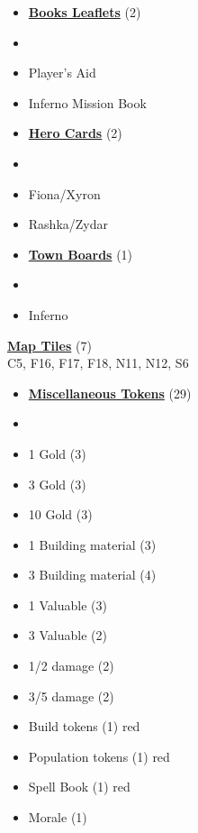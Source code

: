 
\begin{multicols*}{3}

\footnotesize

\begin{itemize}[leftmargin=0pt, label={}, noitemsep]
  \item \textbf{\small{\underline{Books Leaflets}}} (2)
  \item
  \item Player's Aid
  \item Inferno Mission Book
\end{itemize}

\begin{itemize}[leftmargin=0pt, label={}, noitemsep]
  \item \textbf{\small{\underline{Hero Cards}}} (2)
  \item
  \item Fiona/Xyron
  \item Rashka/Zydar
\end{itemize}

\begin{itemize}[leftmargin=0pt, label={}, noitemsep]
  \item \textbf{\small{\underline{Town Boards}}} (1)
  \item
  \item Inferno
\end{itemize}

\textbf{\small{\underline{Map Tiles}}} (7)\\

C5, F16, F17, F18, N11, N12, S6

\begin{itemize}[leftmargin=0pt, label={}, noitemsep]
  \item \textbf{\small{\underline{Miscellaneous Tokens}}} (29)
  \item
  \item 1 Gold (3)
  \item 3 Gold (3)
  \item 10 Gold (3)
  \item 1 Building material (3)
  \item 3 Building material (4)
  \item 1 Valuable (3)
  \item 3 Valuable (2)
  \item 1/2 damage (2)
  \item 3/5 damage (2)
  \item Build tokens (1) {red}
  \item Population tokens (1) {red}
  \item Spell Book (1) {red}
  \item Morale (1)
\end{itemize}


\end{multicols*}
